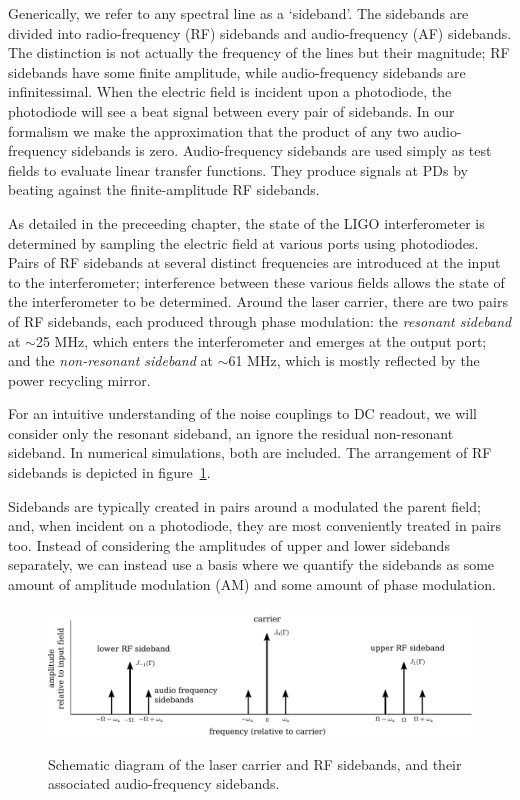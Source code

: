 Generically, we refer to any spectral line as a `sideband'.  The
sidebands are divided into radio-frequency (RF) sidebands and
audio-frequency (AF) sidebands. The distinction is not actually the
frequency of the lines but their magnitude; RF sidebands have some
finite amplitude, while audio-frequency sidebands are infinitessimal.
When the electric field is incident upon a photodiode, the photodiode
will see a beat signal between every pair of sidebands.  In our
formalism we make the approximation that the product of any two
audio-frequency sidebands is zero.  Audio-frequency sidebands are used
simply as test fields to evaluate linear transfer functions.  They
produce signals at PDs by beating against the finite-amplitude RF
sidebands.

As detailed in the preceeding chapter, the state of the LIGO interferometer is
determined by sampling the electric field at various ports using photodiodes.
Pairs of RF sidebands at several distinct frequencies are introduced at the
input to the interferometer; interference between these various fields allows
the state of the interferometer to be determined.  Around the laser carrier,
there are two pairs of RF sidebands, each produced through phase modulation: the
\emph{resonant sideband} at $\sim$25 MHz, which enters the interferometer and
emerges at the output port; and the \emph{non-resonant sideband} at $\sim$61
MHz, which is mostly reflected by the power recycling mirror.


For an intuitive understanding of the noise couplings to DC readout, we will
consider only the resonant sideband, an ignore the residual non-resonant
sideband.  In numerical simulations, both are included.  The arrangement of RF
sidebands is depicted in figure~\ref{fig:af-sidebands}.

Sidebands are typically created in pairs around a modulated the parent field;
and, when incident on a photodiode, they are most conveniently treated in pairs
too.  Instead of considering the amplitudes of upper and lower sidebands
separately, we can instead use a basis where we quantify the sidebands as some
amount of amplitude modulation (AM) and some amount of phase modulation.

\begin{figure}[]
\includegraphics[width=\columnwidth]{figures/af_sidebands.pdf}
\label{fig:af-sidebands}
\caption[Radio- and audio-frequency sidebands]{Schematic diagram of the laser carrier and RF sidebands, and their
  associated audio-frequency sidebands.}
\end{figure}

